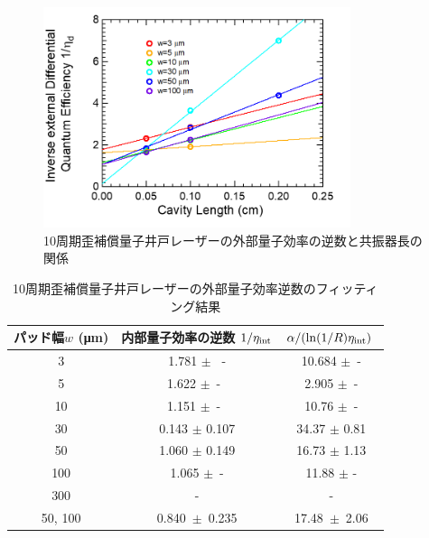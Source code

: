 {\begin{figure}[h]
	\centering
	\includegraphics[width=9cm]{figure/fig_3_1_10QW_broadcontact_id_inverse_02.png}
	\caption{10周期歪補償量子井戸レーザーの外部量子効率の逆数と共振器長の関係}
	\label{fig:fig_3_1_10QW_broadcontact_id_inverse_02}
\end{figure}
\begin{table}[h]
  \caption{10周期歪補償量子井戸レーザーの外部量子効率逆数のフィッティング結果}
  \label{table:table_10QW_i_d_fit}
  \centering
  \begin{tabular}{ccc}
    \hline
    パッド幅$w$ (\si{\micro\metre})  &  内部量子効率の逆数 $1/\eta_{\rm{int}} $ & $\alpha/(\ln(1/R)\eta_{\rm{int}})\ $ \\
    \hline \hline
     3 & 1.781 $\pm$ \ -  & 10.684 $\pm$\ - \\
    5  & 1.622 $\pm$\ -\  & 2.905 $\pm$\ -\\
    10  & 1.151 $\pm$\ -\  & 10.76 $\pm$\ -\\ 
    30& 0.143 $\pm$ 0.107& 34.37 $\pm$ 0.81\\
    50& 1.060 $\pm$ 0.149&16.73 $\pm$ 1.13 \\
    100& 1.065 $\pm$\ -& 11.88 $\pm$ -\\
    300&- & -\\
    \hline
    50, 100  &0.840\ $\pm$\ 0.235& 17.48\ $\pm$\ 2.06\\ 
    \hline
  \end{tabular}
\end{table}

\newpage


}

